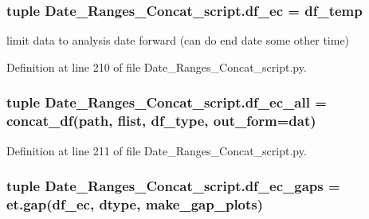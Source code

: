 \subsubsection[{df\+\_\+ec}]{\setlength{\rightskip}{0pt plus 5cm}tuple Date\+\_\+\+Ranges\+\_\+\+Concat\+\_\+script.\+df\+\_\+ec = {\bf df\+\_\+temp}}\label{namespace_date___ranges___concat__script_a6b75ca8020ee28148a9e0c6d2772773f}


limit data to analysis date forward (can do end date some other time) 



Definition at line 210 of file Date\+\_\+\+Ranges\+\_\+\+Concat\+\_\+script.\+py.

\hypertarget{namespace_date___ranges___concat__script_ad91435fa2329924f81af6219f338116d}{}
\subsubsection[{df\+\_\+ec\+\_\+all}]{\setlength{\rightskip}{0pt plus 5cm}tuple Date\+\_\+\+Ranges\+\_\+\+Concat\+\_\+script.\+df\+\_\+ec\+\_\+all = {\bf concat\+\_\+df}({\bf path}, {\bf flist}, {\bf df\+\_\+type}, out\+\_\+form=\textquotesingle{}dat\textquotesingle{})}\label{namespace_date___ranges___concat__script_ad91435fa2329924f81af6219f338116d}


Definition at line 211 of file Date\+\_\+\+Ranges\+\_\+\+Concat\+\_\+script.\+py.

\hypertarget{namespace_date___ranges___concat__script_a641948c3ac1c392abde496a098a79699}{}
\subsubsection[{df\+\_\+ec\+\_\+gaps}]{\setlength{\rightskip}{0pt plus 5cm}tuple Date\+\_\+\+Ranges\+\_\+\+Concat\+\_\+script.\+df\+\_\+ec\+\_\+gaps = et.\+gap({\bf df\+\_\+ec}, {\bf dtype}, {\bf make\+\_\+gap\+\_\+plots})}\label{namespace_date___ranges___concat__script_a641948c3ac1c392abde496a098a79699}


